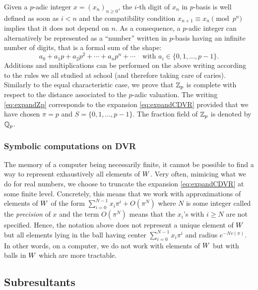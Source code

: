 \documentclass{article}
\begin{document}
Given a $p$-adic integer $x = (x_n)_{n \geq 0}$, the $i$-th digit of 
$x_n$ in $p$-basis is well defined as soon as $i<n$ and the 
compatibility condition $x_{n+1} \equiv x_n \pmod{p^n}$ implies that 
it does not depend on $n$. As a consequence, a $p$-adic integer can 
alternatively be represented as a ``number'' written in $p$-basis having 
an infinite number of digits, that is a formal sum of the shape:
\begin{equation}
\label{eq:expandZp}
a_0 + a_1 p + a_2 p^2 + \cdots + a_n p^n + \cdots
\quad \text{with } a_i \in \{0, 1, \ldots, p-1\}.
\end{equation}
Additions and multiplications can be performed on the above writing
according to the rules we all studied at school (and therefore taking
care of caries). Similarly to the equal characteristic case, we prove
that $\mathbb Z_p$ is complete with respect to the distance associated to the 
$p$-adic valuation. The writing \eqref{eq:expandZp} corresponds to the 
expansion \eqref{eq:expandCDVR} provided that we have chosen $\pi = p$ 
and $S = \{0, 1, \ldots, p-1\}$.
The fraction field of $\mathbb Z_p$ is denoted by $\mathbb Q_p$.

\subsubsection*{Symbolic computations on DVR}


The memory of a computer being necessarily finite, it cannot be possible 
to find a way to represent exhaustively all elements of $W$. 
Very often, mimicing what we do for real numbers, we choose to truncate 
the expansion \eqref{eq:expandCDVR} at some finite level. Concretely,
this means that we work with approximations of elements of $W$ of the
form
$\sum_{i=0}^{N-1} x_i \pi^i + O(\pi^N)$
where $N$ is some integer called the \emph{precision} of $x$ and 
the term $O(\pi^N)$ means that the $x_i$'s with $i \geq N$ are not 
specified. Hence, the notation above does not represent a unique
element of $W$ but all elements lying in the ball having center
$\sum_{i=0}^{N-1} x_i \pi^i$ and radius $e^{-N v(\pi)}$. In other
words, on a computer, we do not work with elements of $W$ but with
balls in $W$ which are more tractable.

\subsection{Subresultants}
\label{subsec:subres}
\end{document}
